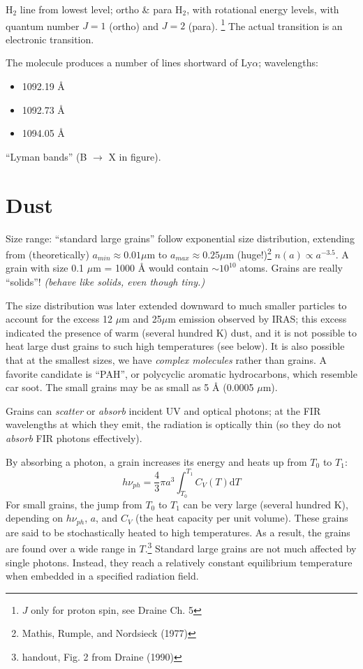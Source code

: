 \documentclass[11pt]{article}
\newcommand{\mar}[1]{\hspace{0pt}\marginpar{-\textcolor{black}{#1}-}}
\newcommand{\mynotes}[1]{{\fontfamily{cmss}\selectfont \textit{#1}}}
\begin{document}
H$_{2}$ line from lowest level; ortho \& para H$_{2}$, with rotational
energy levels, with quantum number $J=1$ (ortho) and $J=2$ (para).
\footnote{$J$ only for proton spin, see Draine Ch. 5}
The actual transition is an electronic transition.

The molecule produces a number of lines shortward of Ly$\alpha$;
wavelengths:
\begin{itemize}
    \item 1092.19 \AA{}
    \item 1092.73 \AA{}
    \item 1094.05 \AA{}
\end{itemize}
``Lyman bands'' (B $\rightarrow$ X in figure).

\newpage
\section{Dust}
\mar{104}Size range: ``standard large grains'' follow exponential size
distribution, extending from (theoretically) $a_{min} \approx 0.01 \mu$m to
$a_{max} \approx 0.25 \mu$m (huge!)\footnote{Mathis, Rumple, and Nordsieck
(1977)} $n(a) \propto a^{-3.5}$. A grain with size 0.1 $\mu$m = 1000 \AA{}
would contain $\sim 10^{10}$ atoms. Grains are really ``solids''!
\mynotes{(behave like solids, even though tiny.)}

The size distribution was later extended downward to much smaller particles to
account for the excess 12 $\mu$m and 25$\mu$m emission observed by IRAS; this
excess indicated the presence of warm (several hundred K) dust, and it is not
possible to heat large dust grains to such high temperatures (see below). It is
also possible that at the smallest sizes, we have \textit{complex molecules}
rather than grains. A favorite candidate is ``PAH'', or polycyclic aromatic
hydrocarbons, which resemble car soot. The small grains may be as small as 5
\AA{} (0.0005 $\mu$m).

Grains can \emph{scatter} or \emph{absorb} incident UV and optical photons; at
the FIR wavelengths at which they emit, the radiation is optically thin (so
they do not \mar{105} \emph{absorb} FIR photons effectively).

By absorbing a photon, a grain increases its energy and heats up from
$T_{0}$ to $T_{1}$:
\[
    h\nu_{ph} = \frac{4}{3}{\pi}a^{3} \int_{T_{0}}^{T_{1}} {
        C_{V} (T) \mathrm{d}T }
    \]
For small grains, the jump from $T_{0}$ to $T_{1}$ can be very large
(several hundred K), depending on $h\nu_{ph}$, $a$, and $C_{V}$ (the heat
capacity per unit volume). These grains are said to be stochastically
heated to high temperatures. As a result, the grains are found over a wide
range in $T$.\footnote{handout, Fig. 2 from Draine (1990)}
Standard large grains are not much affected by single photons. Instead, they
reach a relatively constant equilibrium temperature when embedded in a
specified radiation field.
\end{document}
